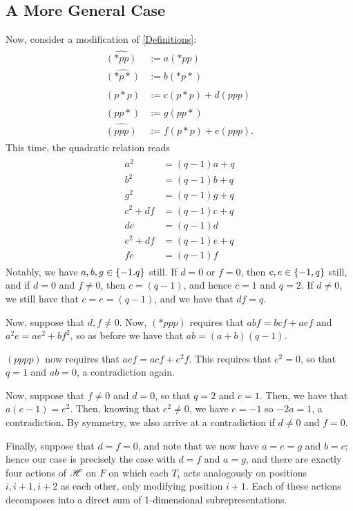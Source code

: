 \documentclass{amsart}
\begin{document}
\subsection{A More General Case}
Now, consider a modification of \eqref{Definitions}:
\begin{align}
  \begin{split}
  \widehat{(*pp)} &:= a(*pp)\\
  \widehat{(*p*)} &:= b(*p*)\\
  \widehat{(p*p)} &:= c(p*p) + d(ppp)\\
  \widehat{(pp*)} &:= g(pp*)\\
  \widehat{(ppp)} &:= f(p*p) + e(ppp).
  \end{split}
  \label{General Definitions}
\end{align} 
This time, the quadratic relation reads
\begin{align}
  \begin{split}
  a^2 &= (q-1)a + q\\
  b^2 &= (q-1)b + q\\
  g^2 &= (q-1)g + q\\
  c^2 + df &= (q -1)c + q\\
  de &= (q-1)d\\
  e^2 + df &= (q -1)e + q\\
  fc &= (q-1)f
\end{split}
  \label{General Quadratic}
\end{align}
Notably, we have $a,b,g \in \left\{ -1.q \right\}$ still.
If $d = 0$ or $f = 0$, then $c,e \in \left\{ -1,q \right\}$ still, and if $d = 0$ and $f \neq 0$, then $c = (q-1)$, and hence $c = 1$ and $q = 2$.
If $d \neq 0$, we still have that $c = e = (q-1)$, and we have that $df = q$.

Now, suppose that $d,f \neq 0$.
Now, $(*ppp)$ requires that $abf = bcf + aef$ and $a^2e = ae^2 + bf^2$, so as before we have that $ab = (a+b)(q-1)$.

$(pppp)$ now requires that $aef = acf + e^2f$.
This requires that $e^2 = 0$, so that $q = 1$ and $ab = 0$, a contradiction again.

Now, suppose that $f \neq 0$ and $d = 0$, so that $q = 2$ and $c = 1$.
Then, we have that $a(e-1) = e^2$.
Then, knowing that $e^2 \neq 0$, we have $e = -1$ so $-2a = 1$, a contradiction.
By symmetry, we also arrive at a contradiction if $d \neq 0$ and $f = 0$.

Finally, suppose that $d = f = 0$, and note that we now have $a = e = g$ and $b = c$;
hence our case is precisely the case with $d = f$ and $a = g$, and there are exactly four actions of $\mathscr{H}$ on $F$ on which each $T_i$ acts analogously on positions $i,i+1,i+2$ as each other, only modifying position $i+1$. 
Each of these actions decomposes into a direct sum of 1-dimensional subrepresentations.

\newpage

\fi
\end{document}
